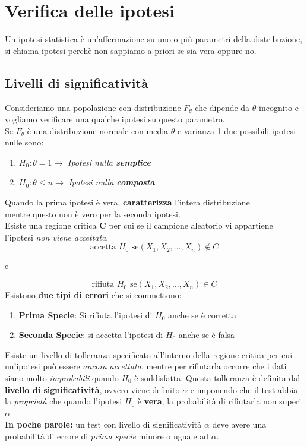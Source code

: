 \documentclass[]{article}
\begin{document}
    \section{Verifica delle ipotesi}
    Un ipotesi statistica è un'affermazione su uno o più parametri della distribuzione, si chiama ipotesi perchè non sappiamo a priori se sia vera oppure no.
    \subsection{Livelli di significatività}
    Consideriamo una popolazione con distribuzione $F_\theta$ che dipende da $\theta$ incognito e vogliamo verificare una qualche ipotesi su questo parametro. \\
    Se $F_\theta$ è una distribuzione normale con media $\theta$ e varianza 1 due possibili ipotesi nulle sono:
    \begin{enumerate}
        \item $H_0 : \theta = 1 \longrightarrow$ \textit{Ipotesi nulla \textbf{semplice}}
        \item $H_0 : \theta \leq n \longrightarrow$ \textit{Ipotesi nulla \textbf{composta}}
    \end{enumerate}
    Quando la prima ipotesi è vera, \textbf{caratterizza} l'intera distribuzione \\
    mentre questo non è vero per la seconda ipotesi. 
    \\[2ex]
    Esiste una regione critica \textbf{C} per cui se il campione aleatorio vi appartiene l'ipotesi \textit{non viene accettata}. \\
    \[ \text{accetta } H_0 \text{ se} (X_1, X_2, \ldots, X_n) \not \in C \]
    \centerline{e}
    \[ \text{rifiuta } H_0 \text{ se} (X_1, X_2, \ldots, X_n) \in C \]
    Esistono \textbf{due tipi di errori} che si commettono:
    \begin{enumerate}
        \item \textbf{Prima Specie}: Si rifiuta l'ipotesi di $H_0$ anche se è corretta
        \item \textbf{Seconda Specie}: si accetta l'ipotesi di $H_0$ anche se è falsa
    \end{enumerate}
    Esiste un livello di tolleranza specificato all'interno della regione critica per cui un'ipotesi può essere \textit{ancora accettata}, mentre per rifiutarla occorre che i dati siano molto \textit{improbabili} quando $H_0$ è soddisfatta.
    Questa tolleranza è definita dal \textbf{livello di significatività}, ovvero viene definito $\alpha$ e imponendo che il test abbia la \textit{proprietà} che quando l'ipotesi $H_0$ è \textbf{vera}, la probabilità di rifiutarla non superi $\alpha$ \\[2ex]
    \textbf{In poche parole:} un test con livello di significatività $\alpha$ deve avere una probabilità di errore di \textit{prima specie} minore o uguale ad $\alpha$.
\end{document}
